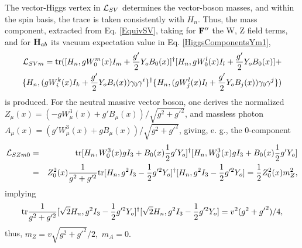 \documentclass[12pt]{article}
\renewcommand\[{\begin{dmath}}
\renewcommand\]{\end{dmath}}
\begin{document}
The vector-Higgs vertex in  ${\cal L}_{SV}$ determines  the vector-boson masses, and within the  spin basis,
the trace     is taken consistently with
     $H_{n}$.
  Thus, the    mass component, extracted from Eq. \ref{EquivSV}, taking for ${\bf F''}$ the W, Z field terms, and for ${\bf H}_{ab}$ its vacuum expectation value in Eq.  \ref{HiggsComponentsYm1},
 \begin{eqnarray}
\label  {HiggsCompleteYm1}{\cal L}_{SVm}=  {\rm  tr }([ H_n ,  g W_0^m(x)  I_m+\frac{g'}{2} Y_o  B_0(x)  ]^\dagger
   [ H_n , gW_0^l(x)  I_l+
   \frac{g'}{2} Y_o  B_0(x) ]+ \\ \nonumber
   \{H_n,(g W_i^k(x)  I_k+ \frac{g'}{2}Y_o  B_i(x)) \gamma_0\gamma^i \}^\dagger
  \{ H_n,(g W_j^l(x)  I_l+ \frac{g'}{2} Y_o B_j(x)) \gamma_0\gamma^j \} )
  \end{eqnarray} is produced.
   For the neutral massive vector boson, one derives the normalized  $Z_\mu(x)=(-g W_\mu^3(x)+g' B_\mu(x))/\sqrt{g^2+ {g'}^2}$, and   massless photon $A_\mu(x)=(g' W_\mu^3(x)+g B_\mu(x))/\sqrt{g^2+ {g'}^2}$,
 giving,  e. g., the 0-component
  \begin{eqnarray}
\label {ZmassEq}
  {\cal L}_{SZm0}&= & {\rm tr}[H_n , W_0^3(x) g I_3+ B_0(x) \frac{1}{2}g'Y_o  ]^\dagger[H_n ,  W_0^3(x) g I_3+  B_0(x) \frac{1}{2} g' Y_o ] \\ \nonumber &=&
 Z_0^2(x)\frac{1}{  g^2+ {g}^{\prime 2}  } {\rm tr}[H_n ,   g^2 I_3-   \frac{1}{2}g^{\prime 2}Y_o  ]^\dagger[H_n ,   g^2 I_3-   \frac{1}{2}g^{\prime 2}Y_o]  =\frac{1}{2} Z_0^2(x)    m_Z ^2
 ,
\end{eqnarray}
 implying \begin{eqnarray}
\label {ZmassEqEx}{\rm tr}\frac{1}{  g^2+ {g}^{\prime 2}  }[\sqrt{2}H_n ,   g^2 I_3-   \frac{1}{2}g^{\prime 2}Y_o  ]^\dagger[\sqrt{2}H_n ,   g^2 I_3-   \frac{1}{2}g^{\prime 2}Y_o]  =   v^2 (g^2+ {g'}^2)/4,\end{eqnarray}
thus, $m_Z=v\sqrt{g^2+ {g'}^2}/2,$ $m_A=0.$
\end{document}
